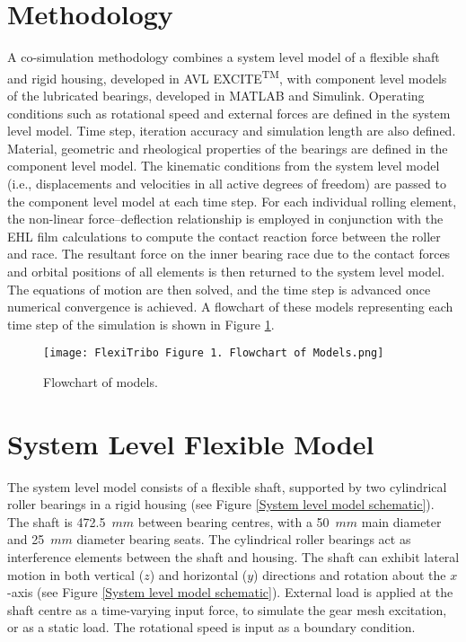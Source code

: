 \section{Methodology}

A co-simulation methodology combines a system level model of a flexible shaft and rigid housing, developed in AVL EXCITE\textsuperscript{TM}, with component level models of the lubricated bearings, developed in MATLAB and Simulink. Operating conditions such as rotational speed and external forces are defined in the system level model. Time step, iteration accuracy and simulation length are also defined. Material, geometric and rheological properties of the bearings are defined in the component level model. The kinematic conditions from the system level model (i.e., displacements and velocities in all active degrees of freedom) are passed to the component level model at each time step. For each individual rolling element, the non-linear force–deflection relationship is employed in conjunction with the EHL film calculations to compute the contact reaction force between the roller and race. The resultant force on the inner bearing race due to the contact forces and orbital positions of all elements is then returned to the system level model. The equations of motion are then solved, and the time step is advanced once numerical convergence is achieved. A flowchart of these models representing each time step of the simulation is shown in Figure \ref{Flowchart of models}.

\begin{figure}
	\centering
	\texttt{[image: FlexiTribo Figure 1. Flowchart of Models.png]}
	\caption{Flowchart of models.}
	\label{Flowchart of models}
\end{figure} 

\section{System Level Flexible Model} \label{System level flexible model}

The system level model consists of a flexible shaft, supported by two cylindrical roller bearings in a rigid housing (see Figure \ref{System level model schematic}). The shaft is 472.5~$mm$ between bearing centres, with a 50~$mm$ main diameter and 25~$mm$ diameter bearing seats. The cylindrical roller bearings act as interference elements between the shaft and housing. The shaft can exhibit lateral motion in both vertical ($z$) and horizontal ($y$) directions and rotation about the $x$-axis (see Figure \ref{System level model schematic}). External load is applied at the shaft centre as a time-varying input force, to simulate the gear mesh excitation, or as a static load. The rotational speed is input as a boundary condition.

